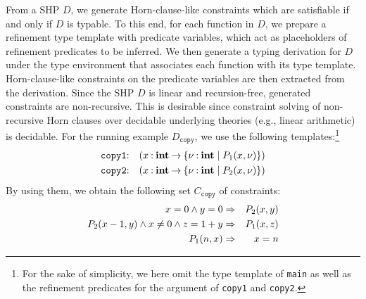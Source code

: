 From a SHP \(D\), we generate Horn-clause-like constraints which are
satisfiable if and only if \(D\) is typable.  To this end, for each
function in \(D\), we prepare a refinement type template with predicate
variables, which act as placeholders of refinement predicates to be
inferred.  We then generate a typing derivation for \(D\) under the type
environment that associates each function with its type template.
Horn-clause-like constraints on the predicate variables are then
extracted from the derivation.  Since the SHP \(D\) is linear and
recursion-free, generated constraints are non-recursive.  This is
desirable since constraint solving of non-recursive Horn clauses over
decidable underlying theories (e.g., linear arithmetic) is decidable.
For the running example \(D_{\texttt{copy}}\), we use the following
templates:\footnote{For the sake of simplicity, we here omit the type
template of \texttt{main} as well as the refinement predicates for the
argument of \texttt{copy1} and \texttt{copy2}.}
\begin{eqnarray*}
\texttt{copy1}&\mathbin{:}&(x\mathbin{:}{\mathbf{int}}\mathbin{\rightarrow}{\{{\nu\mathbin{:}\mathbf{int} \mid P_1(x,\nu)}\}}) \\
\texttt{copy2}&\mathbin{:}&(x\mathbin{:}{\mathbf{int}}\mathbin{\rightarrow}{\{{\nu\mathbin{:}\mathbf{int} \mid P_2(x,\nu)}\}})
\end{eqnarray*}
By using them, we obtain the following set \(C_{\texttt{copy}}\) of
constraints:
\begin{eqnarray*}
x=0 \land y=0 &\Rightarrow& P_2(x,y) \\
P_2(x-1,y) \land x\neq0 \land z=1+y &\Rightarrow& P_1(x,z) \\
P_1(n,x) &\Rightarrow& x=n
\end{eqnarray*}


